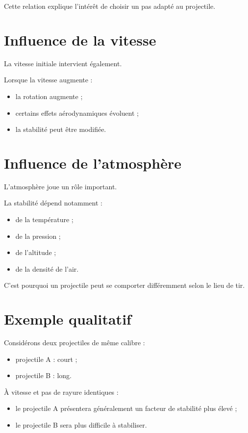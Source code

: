 Cette relation explique l'intérêt de choisir un pas adapté au projectile.

\section{Influence de la vitesse}

La vitesse initiale intervient également.

Lorsque la vitesse augmente :

\begin{itemize}
    \item la rotation augmente ;
    \item certains effets aérodynamiques évoluent ;
    \item la stabilité peut être modifiée.
\end{itemize}

\section{Influence de l'atmosphère}

L'atmosphère joue un rôle important.

La stabilité dépend notamment :

\begin{itemize}
    \item de la température ;
    \item de la pression ;
    \item de l'altitude ;
    \item de la densité de l'air.
\end{itemize}

C'est pourquoi un projectile peut se comporter différemment selon le lieu de
tir.

\section{Exemple qualitatif}

Considérons deux projectiles de même calibre :

\begin{itemize}
    \item projectile A : court ;
    \item projectile B : long.
\end{itemize}

À vitesse et pas de rayure identiques :

\begin{itemize}
    \item le projectile A présentera généralement un facteur de stabilité
          plus élevé ;
    \item le projectile B sera plus difficile à stabiliser.
\end{itemize}

